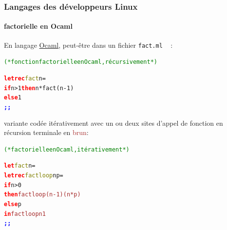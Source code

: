 \documentclass[xcolor=svgnames,final,smaller,a4]{beamer}
\begin{document}
\begin{frame}
  \frametitle{Langages des développeurs Linux}
  \framesubtitle{factorielle en Ocaml}

  En langage \href{https://ocaml.org/}{Ocaml}, peut-être dans un fichier \texttt{fact.ml} ~ :

  \begin{alltt}
    \textcolor{green}{(*fonction factorielle en Ocaml, récursivement*)}

    \textcolor{red}{\textbf{let rec}}  \textcolor{Olive}{fact} n = \\
    \hspace{1cm} \textcolor{red}{\textbf{if}} n > 1  \textcolor{red}{\textbf{then}} n * fact (n - 1) \\
    \hspace{1cm} \textcolor{red}{\textbf{else}} 1 \\
     \textcolor{blue}{\textbf{;;}} 
  \end{alltt}

  variante codée itérativement avec un ou deux sites d'appel de fonction en récursion
  terminale en \textcolor{Brown}{brun}:
  
  \begin{alltt}
    \textcolor{green}{(*factorielle en Ocaml, itérativement*)}

    \textcolor{red}{\textbf{let}}  \textcolor{Olive}{fact} n = \\
    \hspace{1cm} \textcolor{red}{\textbf{let rec}}  \textcolor{Olive}{factloop} n p = \\
    \hspace{1.5cm} \textcolor{red}{\textbf{if}} n > 0  \\
    \hspace{1.5cm} \textcolor{red}{\textbf{then}} \textcolor{Brown}{factloop (n - 1) (n * p)} \\
    \hspace{1.5cm} \textcolor{red}{\textbf{else}} p \\    
    \hspace{1cm} \textcolor{red}{\textbf{in}} \textcolor{Brown}{factloop n 1}\\
     \textcolor{blue}{\textbf{;;}} 
  \end{alltt}
  
\end{frame}
\end{document}
